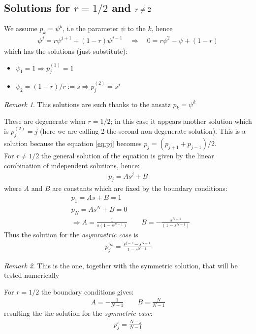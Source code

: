 \documentclass[4apaper,11pt,fleqn]{article}
\theoremstyle{remark}
\newtheorem*{rem}{Remark}
\theoremstyle{definition}
\begin{document}
\subsection{Solutions for $r=1/2$ and $r\neq\/2$}
We assume $p_k = \psi^k$, i.e the parameter $\psi$ to the $k$, hence
\begin{align*}
  \psi^j = r\psi^{j+1} + (1-r) \psi^{j-1} \quad \Rightarrow \quad 0 = r\psi^2 - \psi + (1-r)
\end{align*}
which has the solutions (just substitute):
\begin{itemize}[leftmargin=*]
  \item $\psi_1 = 1 \Rightarrow p_j^{(1)} = 1$
  \item $\psi_2 = (1-r)/r := s \Rightarrow  p_j^{(2)} = s^j$
\end{itemize}
\begin{rem}
  This solutions are such thanks to the ansatz $p_k = \psi^k$
\end{rem}
These are degenerate when $r=1/2$; in this case it appears another solution which is $p_j^{(2)} = j$ (here we are calling 2 the second non degenerate solution). This is a solution because the equation \eqref{eq:pj} becomes $p_j = (p_{j+1}+p_{j-1})/2$.\\
For $r\neq1/2$ the general solution of the equation is given by the linear combination of independent solutions, hence:
\begin{align*}
  p_j = As^j + B
\end{align*}
where $A$ and $B$ are constants which are fixed by the boundary conditions:
\begin{align*}
   &p_1 = As + B = 1\\
   &p_N = As^N + B = 0\\
   &\Rightarrow A= \frac{1}{s(1-s^{N-1})} \qquad B = - \frac{s^{N-1}}{(1-s^{N-1})}
\end{align*}
Thus the solution for the \emph{asymmetric case} is
\begin{align}
  p_j^{as} = \frac{s^{j-1}-s^{N-1}}{1-s^{N-1}}
\end{align}
\begin{rem}
  This is the one, together with the symmetric solution, that will be tested numerically
\end{rem}

For $r=1/2$ the boundary conditions gives:
\begin{align*}
  A = -\frac{1}{N-1} \qquad B = \frac{N}{N-1}
\end{align*}
resulting the the solution for the \emph{symmetric case}:
\begin{align}
  p_j^{s} = \frac{N-j}{N-1}
\end{align}
\end{document}
